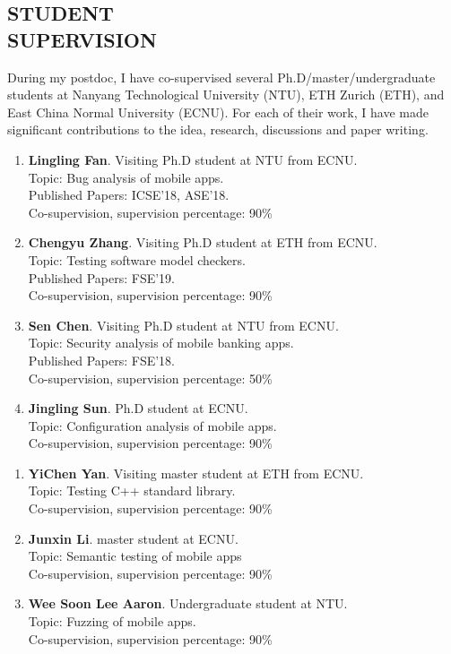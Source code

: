 \documentclass[margin]{res}
\begin{document}
\begin{resume}
\section{STUDENT\\SUPERVISION}
During my postdoc, I have co-supervised several Ph.D/master/undergraduate students at Nanyang Technological University (NTU), ETH Zurich (ETH), and East China Normal University (ECNU). For each of their work, I have made significant contributions to the idea, research, discussions and paper writing.

\begin{enumerate}[leftmargin=*]
    \item \textbf{Lingling Fan}. Visiting Ph.D student at NTU from ECNU. \\Topic: Bug analysis of mobile apps. \\Published Papers: ICSE'18, ASE'18. \\Co-supervision, supervision percentage: 90\%
    \item \textbf{Chengyu Zhang}. Visiting Ph.D student at ETH from ECNU. \\Topic: Testing software model checkers. \\Published Papers: FSE'19. \\Co-supervision, supervision percentage: 90\%
    \item \textbf{Sen Chen}. Visiting Ph.D student at NTU from ECNU. \\Topic: Security analysis of mobile banking apps. \\Published Papers: FSE'18. \\Co-supervision, supervision percentage: 50\%
    \item \textbf{Jingling Sun}. Ph.D student at ECNU. \\Topic: Configuration analysis of mobile apps. \\Co-supervision, supervision percentage: 90\%
\end{enumerate}
\begin{enumerate}[leftmargin=*]
    \item \textbf{YiChen Yan}. Visiting master student at ETH from ECNU. \\Topic: Testing C++ standard library. \\Co-supervision, supervision percentage: 90\%
    \item \textbf{Junxin Li}. master student at ECNU. \\Topic: Semantic testing of mobile apps \\Co-supervision, supervision percentage: 90\%
    \item \textbf{Wee Soon Lee Aaron}. Undergraduate student at NTU. \\Topic: Fuzzing of mobile apps.  \\Co-supervision, supervision percentage: 90\%
\end{enumerate}


\end{resume}
\end{document}
